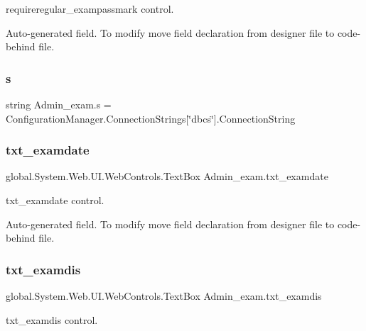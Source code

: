 requireregular\+\_\+exampassmark control. 

Auto-\/generated field. To modify move field declaration from designer file to code-\/behind file. \mbox{\label{class_admin__exam_aa2e22318060149512c85d2350657f1f4}} 
\subsubsection{\texorpdfstring{s}{s}}
{\footnotesize\ttfamily string Admin\+\_\+exam.\+s = Configuration\+Manager.\+Connection\+Strings\mbox{[}\char`\"{}dbcs\char`\"{}\mbox{]}.Connection\+String\hspace{0.3cm}{\ttfamily [private]}}

\mbox{\label{class_admin__exam_aa5245c103c34f1d91c483f0a7f720d66}} 
\subsubsection{\texorpdfstring{txt\_examdate}{txt\_examdate}}
{\footnotesize\ttfamily global.\+System.\+Web.\+U\+I.\+Web\+Controls.\+Text\+Box Admin\+\_\+exam.\+txt\+\_\+examdate\hspace{0.3cm}{\ttfamily [protected]}}



txt\+\_\+examdate control. 

Auto-\/generated field. To modify move field declaration from designer file to code-\/behind file. \mbox{\label{class_admin__exam_a0bbe28c9708463e422886cc122f6ddb0}} 
\subsubsection{\texorpdfstring{txt\_examdis}{txt\_examdis}}
{\footnotesize\ttfamily global.\+System.\+Web.\+U\+I.\+Web\+Controls.\+Text\+Box Admin\+\_\+exam.\+txt\+\_\+examdis\hspace{0.3cm}{\ttfamily [protected]}}



txt\+\_\+examdis control. 

